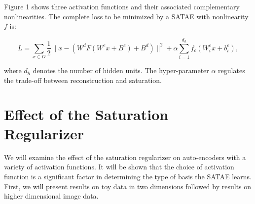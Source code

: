 \noindent Figure 1 shows three activation functions and their associated
complementary nonlinearities. The complete loss to be minimized by a SATAE with
nonlinearity $f$ is: 

\begin{equation} L = \sum_{x \in D} \frac{1}{2} \|x-\left(W^d F(W^e
x+B^e)+B^d\right)\|^2 + \alpha \sum_{i=1}^{d_h}f_c(W^e_i x + b^e_i),
\end{equation}    

\noindent where $d_h$ denotes the number of hidden units. The hyper-parameter
$\alpha$ regulates the trade-off between reconstruction and saturation.  

\section{Effect of the Saturation Regularizer} We will examine the effect of
the saturation regularizer on auto-encoders with a variety of activation
functions. It will be shown that the choice of activation function is a
significant factor in determining the type of basis the SATAE learns. First, we
will present results on toy data in two dimensions followed by results on
higher dimensional image data.

